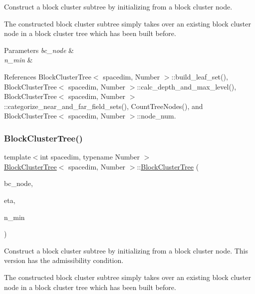 Construct a block cluster subtree by initializing from a block cluster node.

The constructed block cluster subtree simply takes over an existing block cluster node in a block cluster tree which has been built before.


\begin{DoxyParams}{Parameters}
{\em bc\+\_\+node} & \\
\hline
{\em n\+\_\+min} & \\
\hline
\end{DoxyParams}


References Block\+Cluster\+Tree$<$ spacedim, Number $>$\+::build\+\_\+leaf\+\_\+set(), Block\+Cluster\+Tree$<$ spacedim, Number $>$\+::calc\+\_\+depth\+\_\+and\+\_\+max\+\_\+level(), Block\+Cluster\+Tree$<$ spacedim, Number $>$\+::categorize\+\_\+near\+\_\+and\+\_\+far\+\_\+field\+\_\+sets(), Count\+Tree\+Nodes(), and Block\+Cluster\+Tree$<$ spacedim, Number $>$\+::node\+\_\+num.

\mbox{\label{classBlockClusterTree_a522ad51298f5b58b948e435a9e2d2a40}} 
\subsubsection{\texorpdfstring{Block\+Cluster\+Tree()}{BlockClusterTree()}\hspace{0.1cm}{\footnotesize\ttfamily [5/8]}}
{\footnotesize\ttfamily template$<$int spacedim, typename Number $>$ \\
\hyperlink{classBlockClusterTree}{Block\+Cluster\+Tree}$<$ spacedim, Number $>$\+::\hyperlink{classBlockClusterTree}{Block\+Cluster\+Tree} (\begin{DoxyParamCaption}\item[{\hyperlink{classTreeNode}{node\+\_\+pointer\+\_\+type}}]{bc\+\_\+node,  }\item[{const Number}]{eta,  }\item[{const unsigned int}]{n\+\_\+min }\end{DoxyParamCaption})}

Construct a block cluster subtree by initializing from a block cluster node. This version has the admissibility condition.

The constructed block cluster subtree simply takes over an existing block cluster node in a block cluster tree which has been built before.


